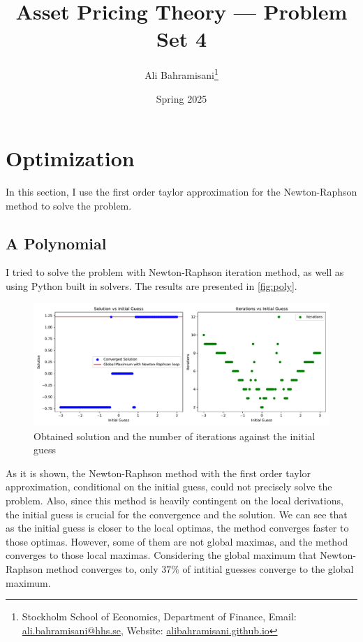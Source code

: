 \documentclass[a4paper,10pt,american]{article}
\title{Asset Pricing Theory --- Problem Set 4}
\author{Ali Bahramisani\thanks{Stockholm School
of Economics, Department of Finance, Email: 
\href{mailto:ali.bahramisani@hhs.se}{ali.bahramisani@hhs.se}, Website: \href{https://alibahramisani.github.io}{alibahramisani.github.io}}}
\date{Spring 2025}
\begin{document}
\maketitle
\thispagestyle{empty}



\newpage
{}

\section{Optimization}
In this section, I use the first order taylor approximation for the Newton-Raphson method to solve the problem.

\subsection{A Polynomial}
I tried to solve the problem with Newton-Raphson iteration method, as well as using Python built in solvers. The results are presented in \autoref{fig:poly}.

\begin{figure}[H]
\centering
\includegraphics[width=1\linewidth]{../Plots/NR_X0.pdf}
\caption{Obtained solution and the number of iterations against the initial guess}
\label{fig:poly}
\end{figure}

As it is shown, the Newton-Raphson method with the first order taylor approximation, conditional on the initial guess, could not precisely solve the problem. Also, since this method is heavily contingent on the local derivations, the initial guess is crucial for the convergence and the solution. We can see that as the initial guess is closer to the local optimas, the method converges faster to those optimas. However, some of them are not global maximas, and the method converges to those local maximas. Considering the global maximum that Newton-Raphson method converges to, only $37\%$ of intitial guesses converge to the global maximum. 
\end{document}
